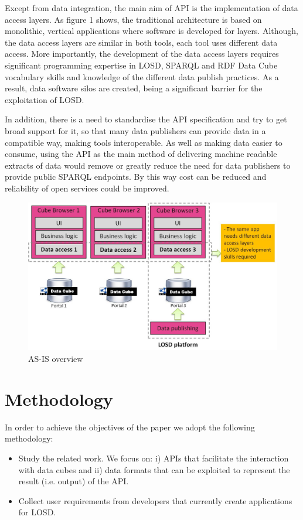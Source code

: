 \documentclass{llncs}
\begin{document}
Except from data integration, the main aim of API is the implementation of data access layers. As figure 1 shows, the traditional architecture is based on monolithic, vertical applications where software is developed for layers. Although, the data access layers are similar in both tools, each tool uses different data access. More importantly, the development of the data access layers requires significant programming expertise in LOSD, SPARQL and RDF Data Cube vocabulary skills and knowledge of the different data publish practices. As a result, data software silos are created, being a significant barrier for the exploitation of LOSD. 

 
 
In addition, there is a need to standardise the API specification and try to get broad support for it, so that many data publishers can provide data in a compatible way, making tools interoperable. As well as making data easier to consume, using the API as the main method of delivering machine readable extracts of data would remove or greatly reduce the need for data publishers to provide public SPARQL endpoints. By this way cost can be reduced and reliability of open services could be improved.

\begin{figure}
\begin{center}
  \includegraphics[width=120mm]{images/overview1.jpg}
  \end{center}
\caption{AS-IS overview}
\label{fig:overview1}
\end{figure}

\section{Methodology}\label{sec:methodology}

In order to achieve the objectives of the paper we adopt the following methodology:
\begin{itemize}
\item Study the related work. We focus on: i) APIs that facilitate the interaction with data cubes and ii) data formats that can be exploited to represent the result (i.e. output) of the API. 
\item Collect user requirements from developers that currently create applications for LOSD. 
\end{itemize}
\end{document}
